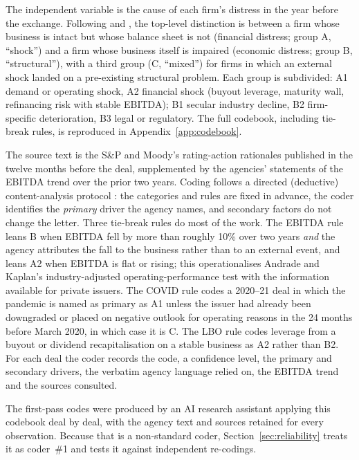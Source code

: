 \documentclass[12pt]{article}
\begin{document}
The independent variable is the cause of each firm's distress in the year before the exchange. Following \citet{wruck1990} and \citet{andrade1998}, the top-level distinction is between a firm whose business is intact but whose balance sheet is not (financial distress; group A, ``shock'') and a firm whose business itself is impaired (economic distress; group B, ``structural''), with a third group (C, ``mixed'') for firms in which an external shock landed on a pre-existing structural problem. Each group is subdivided: A1 demand or operating shock, A2 financial shock (buyout leverage, maturity wall, refinancing risk with stable EBITDA); B1 secular industry decline, B2 firm-specific deterioration, B3 legal or regulatory. The full codebook, including tie-break rules, is reproduced in Appendix~\ref{app:codebook}.

The source text is the S\&P and Moody's rating-action rationales published in the twelve months before the deal, supplemented by the agencies' statements of the EBITDA trend over the prior two years. Coding follows a directed (deductive) content-analysis protocol \citep{hsieh2005}: the categories and rules are fixed in advance, the coder identifies the \emph{primary} driver the agency names, and secondary factors do not change the letter. Three tie-break rules do most of the work. The EBITDA rule leans B when EBITDA fell by more than roughly 10\% over two years \emph{and} the agency attributes the fall to the business rather than to an external event, and leans A2 when EBITDA is flat or rising; this operationalises Andrade and Kaplan's industry-adjusted operating-performance test with the information available for private issuers. The COVID rule codes a 2020--21 deal in which the pandemic is named as primary as A1 unless the issuer had already been downgraded or placed on negative outlook for operating reasons in the 24 months before March 2020, in which case it is C. The LBO rule codes leverage from a buyout or dividend recapitalisation on a stable business as A2 rather than B2. For each deal the coder records the code, a confidence level, the primary and secondary drivers, the verbatim agency language relied on, the EBITDA trend and the sources consulted.

The first-pass codes were produced by an AI research assistant applying this codebook deal by deal, with the agency text and sources retained for every observation. Because that is a non-standard coder, Section~\ref{sec:reliability} treats it as coder~\#1 and tests it against independent re-codings.
\end{document}
